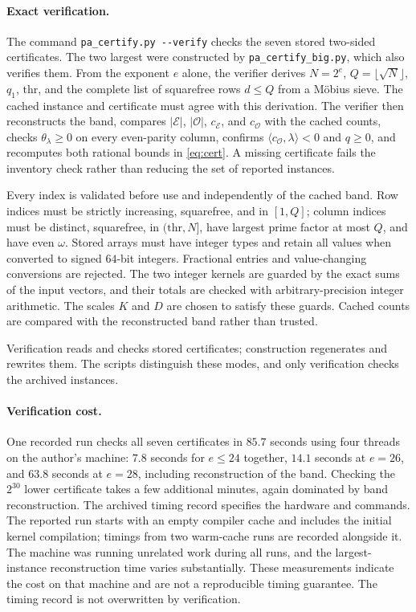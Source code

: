\documentclass[11pt,a4paper]{article}
\theoremstyle{plain}
\theoremstyle{definition}
\theoremstyle{remark}
\newcommand{\thr}{\mathrm{thr}}
\newcommand{\vB}{\mathcal{E}}
\newcommand{\vR}{\mathcal{O}}
\begin{document}
\paragraph{Exact verification.}
The command \texttt{pa\_certify.py\ -{}-verify} checks the seven stored two-sided certificates.
The two largest were constructed by \texttt{pa\_certify\_big.py}, which also verifies them.
From the exponent $e$ alone, the verifier derives $N=2^e$, $Q=\lfloor\sqrt N\rfloor$, $q_1$, $\thr$,
and the complete list of squarefree rows $d\le Q$ from a M\"obius sieve.
The cached instance and certificate must agree with this derivation. The verifier then reconstructs
the band, compares $|\vB|$, $|\vR|$, $c_{\vB}$, and $c_{\vR}$ with the cached counts, checks
$\theta_\lambda\ge0$ on every even-parity column, confirms
$\langle c_{\vR},\lambda\rangle<0$ and $q\ge0$, and recomputes both rational bounds in \eqref{eq:cert}.
A missing certificate fails the inventory check rather than reducing the set of reported instances.

Every index is validated before use and independently of the cached band. Row indices must be
strictly increasing, squarefree, and in $[1,Q]$; column indices must be distinct, squarefree, in
$(\thr,N]$, have largest prime factor at most $Q$, and have even $\omega$.
Stored arrays must have integer types and retain all values when converted to signed $64$-bit integers.
Fractional entries and value-changing conversions are rejected.
The two integer kernels are guarded by the exact sums of the input vectors, and their totals are
checked with arbitrary-precision integer arithmetic. The scales $K$ and $D$ are chosen to satisfy
these guards. Cached counts are compared with the reconstructed band rather than trusted.

Verification reads and checks stored certificates; construction regenerates and rewrites them.
The scripts distinguish these modes, and only verification checks the archived instances.

\paragraph{Verification cost.}
One recorded run checks all seven certificates in $85.7$ seconds using four threads on the author's
machine: $7.8$ seconds for $e\le24$ together, $14.1$ seconds at $e=26$, and $63.8$ seconds at $e=28$,
including reconstruction of the band. Checking the $2^{30}$ lower certificate takes a few additional
minutes, again dominated by band reconstruction.
The archived timing record specifies the hardware and commands. The reported run starts with an
empty compiler cache and includes the initial kernel compilation; timings from two warm-cache
runs are recorded alongside it. The machine was running unrelated work during all runs,
and the largest-instance reconstruction time varies substantially. These measurements indicate the
cost on that machine and are not a reproducible timing guarantee. The timing record is not overwritten
by verification.
\end{document}
